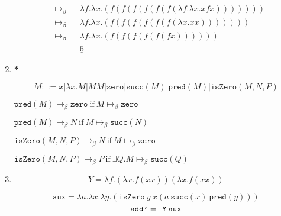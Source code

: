 \documentclass[11pt]{article}
\begin{document}
\begin{enumerate}
\begin{enumerate}
\begin{align*}
			            \mapsto_\beta                                  &  & \lambda f. \lambda x. (f(f(f(f(f(f( \lambda f. \lambda x. x f x)))))))                                                           & \\
			            \mapsto_\beta                                  &  & \lambda f. \lambda x. (f(f(f(f(f(f( \lambda x. x x )))))))                                                                       & \\
			            \mapsto_\beta                                  &  & \lambda f. \lambda x. (f(f(f(f(f(f x))))))                                                                                       & \\
			            =                                              &  & \underline{6}                                                                                                                    &
		            \end{align*}
	      \end{enumerate}
	      \newpage
	\item \textbf{*}

	      $$
		      M ::= x | \lambda x.M | M M | \texttt{zero} | \texttt{succ}(M) | \texttt{pred}( M ) | \texttt{isZero}( M,N,P )
	      $$

	      $ \texttt{pred}(M) \mapsto_\beta \texttt{zero} \: \text{if} \: M \mapsto_\beta \texttt{zero} $

	      $ \texttt{pred}(M) \mapsto_\beta N \: \text{if} \: M \mapsto_\beta \texttt{succ}(N) $

	      $ \texttt{isZero}(M,N,P) \mapsto_\beta N \: \text{if} \: M \mapsto_\beta \texttt{zero} $

	      $ \texttt{isZero}(M,N,P) \mapsto_\beta P \: \text{if} \: \exists Q . M \mapsto_\beta \texttt{succ}(Q) $


	      \newpage
	\item

	      $$
		      Y = \lambda f.( \lambda x. f(xx))( \lambda x.f(xx))
	      $$

	      $$
	      \texttt{aux} = \lambda a. \lambda x. \lambda y. ( \texttt{isZero} \: y \: x ( a \: \texttt{succ}(x) \: \texttt{pred}(y)))
	      $$
	      $$
		      \texttt{add'} = \textbf{ \texttt{Y}} \: \texttt{aux}
	      $$


\end{enumerate}
\end{document}
